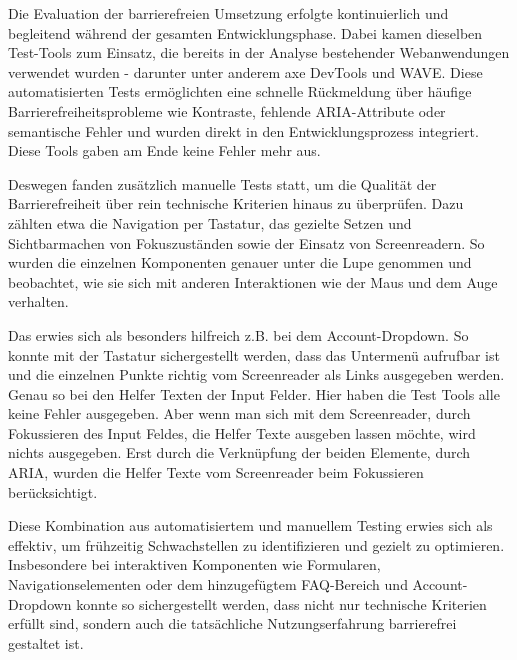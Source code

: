 Die Evaluation der barrierefreien Umsetzung erfolgte kontinuierlich und begleitend während der gesamten Entwicklungsphase. Dabei kamen dieselben Test-Tools zum Einsatz, die bereits in der Analyse bestehender Webanwendungen verwendet wurden - darunter unter anderem axe DevTools und WAVE. Diese automatisierten Tests ermöglichten eine schnelle Rückmeldung über häufige Barrierefreiheitsprobleme wie Kontraste, fehlende ARIA-Attribute oder semantische Fehler und wurden direkt in den Entwicklungsprozess integriert. Diese Tools gaben am Ende keine Fehler mehr aus.

Deswegen fanden zusätzlich manuelle Tests statt, um die Qualität der Barrierefreiheit über rein technische Kriterien hinaus zu überprüfen. Dazu zählten etwa die Navigation per Tastatur, das gezielte Setzen und Sichtbarmachen von Fokuszuständen sowie der Einsatz von Screenreadern. So wurden die einzelnen Komponenten genauer unter die Lupe genommen und beobachtet, wie sie sich mit anderen Interaktionen wie der Maus und dem Auge verhalten.

Das erwies sich als besonders hilfreich z.B. bei dem Account-Dropdown. So konnte mit der Tastatur sichergestellt werden, dass das Untermenü aufrufbar ist und die einzelnen Punkte richtig vom Screenreader als Links ausgegeben werden. Genau so bei den Helfer Texten der Input Felder. Hier haben die Test Tools alle keine Fehler ausgegeben. Aber wenn man sich mit dem Screenreader, durch Fokussieren des Input Feldes, die Helfer Texte ausgeben lassen möchte, wird nichts ausgegeben. Erst durch die Verknüpfung der beiden Elemente, durch ARIA, wurden die Helfer Texte vom Screenreader beim Fokussieren berücksichtigt.

Diese Kombination aus automatisiertem und manuellem Testing erwies sich als effektiv, um frühzeitig Schwachstellen zu identifizieren und gezielt zu optimieren. Insbesondere bei interaktiven Komponenten wie Formularen, Navigationselementen oder dem hinzugefügtem FAQ-Bereich und Account-Dropdown konnte so sichergestellt werden, dass nicht nur technische Kriterien erfüllt sind, sondern auch die tatsächliche Nutzungserfahrung barrierefrei gestaltet ist.
